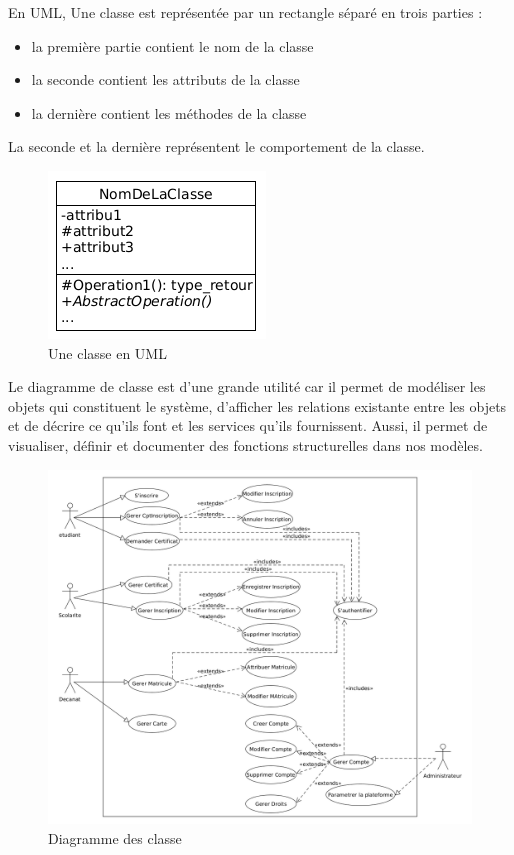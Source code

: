 \documentclass[12pt,a4paper]{article}
\begin{document}
	En UML, Une classe est représentée par un rectangle séparé en trois parties :
	\begin{itemize}
		\item la première partie contient le nom de la classe
		\item la seconde contient les attributs de la classe
		\item la dernière contient les méthodes de la classe
	\end{itemize}
	La seconde et la dernière représentent le comportement de la classe.
	\begin{figure}[H]
		\centering
		\includegraphics[width=.25\textwidth]{class}
		\caption{Une classe en UML}
		\label{fig:figure2}
	\end{figure}	
	Le diagramme de classe est d'une grande utilité car il permet de modéliser les objets qui constituent le système, d'afficher les relations existante entre les objets et de décrire ce qu’ils font et les services qu’ils fournissent. Aussi, il permet de visualiser, définir et documenter des fonctions structurelles dans nos modèles.
	\begin{figure}[H]
		\centering
		\includegraphics[width=15cm]{use_case_diag}
		\caption{Diagramme des classe}
		\label{fig:figure4}
	\end{figure}
	\newpage
\end{document}
